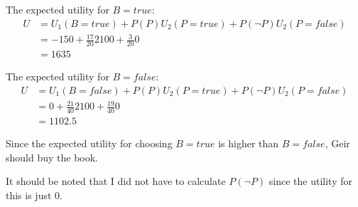 \documentclass[11pt, a4paper, english]{../Template/NTNUoving}
\begin{document}
\begin{oppgave}
\begin{punkt}
        The expected utility for $B=true$:
        \begin{align*}
            U &= U_1(B=true) + P(P) U_2(P=true) + P(\neg P) U_2(P=false) \\
            &= -150 + \frac{17}{20} 2100 + \frac{3}{20} 0 \\
            &= 1635
        \end{align*}

        The expected utility for $B=false$:
        \begin{align*}
            U &= U_1(B=false) + P(P) U_2(P=true) + P(\neg P) U_2(P=false) \\
            &= 0 + \frac{21}{40} 2100 + \frac{19}{40} 0 \\
            &= 1102.5
        \end{align*}

        Since the expected utility for choosing $B=true$ is higher than $B=false$,
        Geir should buy the book.

        It should be noted that I did not have to calculate $P(\neg P)$ since the utility for this is
        just 0.
    \end{punkt}
\end{oppgave}
\clearpage
\end{document}
